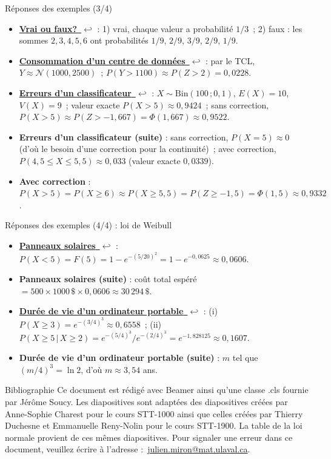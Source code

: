 \documentclass{BeamerTemplate}
\newcommand{\retour}[2]{\hyperlink{#1}{\textbf{#2}~{\color{gray}$\hookleftarrow$}}}
\begin{document}
\begin{frame}[t,label=rep-ex3]{Réponses des exemples (3/4)}
\footnotesize
\begin{itemize}\itemsep4pt
\item \retour{quizurne}{Vrai ou faux?} : 1) vrai, chaque valeur a probabilité $1/3$~;
2) faux : les sommes $2,3,4,5,6$ ont probabilités $1/9$, $2/9$, $3/9$, $2/9$, $1/9$.
\item \retour{excentre}{Consommation d'un centre de données} : par le TCL, $Y\approx\mathcal{N}(1000,2500)$~;
$P(Y>1100)\approx P(Z>2)=0{,}0228$.
\item \retour{exclassif}{Erreurs d'un classificateur} : $X\sim\text{Bin}(100\,;0{,}1)$, $E(X)=10$, $V(X)=9$~;
valeur exacte $P(X>5)\approx0{,}9424$~; sans correction, $P(X>5)\approx P(Z>-1{,}667)=\Phi(1{,}667)\approx0{,}9522$.
\item \textbf{Erreurs d'un classificateur (suite)} : sans correction, $P(X=5)\approx0$ (d'où le besoin
d'une correction pour la continuité)~; avec correction, $P(4{,}5\le X\le5{,}5)\approx0{,}033$
(valeur exacte $0{,}0339$).
\item \textbf{Avec correction} : $P(X>5)=P(X\ge6)\approx P(X\ge5{,}5)=P(Z\ge-1{,}5)=\Phi(1{,}5)\approx0{,}9332$.
\end{itemize}
\end{frame}


\begin{frame}[t,label=rep-ex4]{Réponses des exemples (4/4) : loi de Weibull}
\footnotesize
\begin{itemize}\itemsep4pt
\item \retour{exsolaire}{Panneaux solaires} : $P(X<5)=F(5)=1-e^{-(5/20)^2}=1-e^{-0{,}0625}\approx0{,}0606$.
\item \textbf{Panneaux solaires (suite)} : coût total espéré
$=500\times1000\,\$\times0{,}0606\approx30\,294\,\$$.
\item \retour{exportable}{Durée de vie d'un ordinateur portable} : (i) $P(X\ge3)=e^{-(3/4)^3}\approx0{,}6558$~;
(ii) $P(X\ge5\,|\,X\ge2)=e^{-(5/4)^3}/e^{-(2/4)^3}=e^{-1{,}828125}\approx0{,}1607$.
\item \textbf{Durée de vie d'un ordinateur portable (suite)} : $m$ tel que $(m/4)^3=\ln2$,
d'où $m\approx3{,}54$ ans.
\end{itemize}
\end{frame}


\begin{frame}{Bibliographie}
 	Ce document est rédigé avec Beamer ainsi qu'une classe .cls fournie par Jérôme Soucy. Les diapositives sont adaptées des diapositives créées par Anne-Sophie Charest
 pour le cours STT-1000 ainsi que celles créées par Thierry Duchesne et Emmanuelle Reny-Nolin pour le cours STT-1900. La table de la loi normale provient de ces mêmes diapositives.
 	\printbibliography
 	\vfill
 	\footnotesize Pour signaler une erreur dans ce document, veuillez écrire à l'adresse :~\href{mailto:julien.miron@mat.ulaval.ca}{julien.miron@mat.ulaval.ca}.
 \end{frame}
\end{document}
